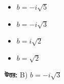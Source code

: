 \documentclass[12pt, a4paper]{article}
\begin{document}
\begin{itemize}[label={}, leftmargin=1cm, itemsep=0.5em]
    \item[\textbf{A)}] $b = -i\sqrt{5}$
    \item[\textbf{B)}] $b = -i\sqrt{3}$
    \item[\textbf{C)}] $b = i\sqrt{2}$
    \item[\textbf{D)}] $b = \sqrt{2}$
\end{itemize}

\vspace{0.5em}
\begin{tcolorbox}[answerbox]
    \textbf{\color{success} উত্তর:} B) $b = -i\sqrt{3}$
\end{tcolorbox}
\vspace{1em}
\end{document}

